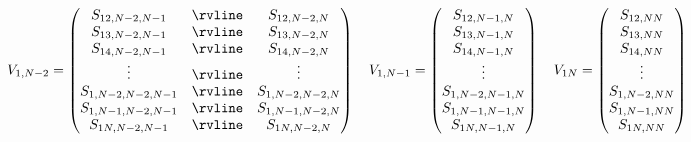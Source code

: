 \begin{appendices}
\begin{equation}
    \label{eq:ch3_QSD-V_1N_2}
    V_{1,N-2} =
    \begin{pmatrix}
        S_{12,N-2,N-1} & \rvline & S_{12,N-2,N} \\
        S_{13,N-2,N-1} & \rvline & S_{13,N-2,N} \\
        S_{14,N-2,N-1} & \rvline & S_{14,N-2,N} \\
        \vdots & \rvline & \vdots \\
        S_{1,N-2,N-2,N-1} & \rvline & S_{1,N-2,N-2,N} \\
        S_{1,N-1,N-2,N-1} & \rvline & S_{1,N-1,N-2,N} \\
        S_{1N,N-2,N-1} & \rvline & S_{1N,N-2,N} \\
    \end{pmatrix}
    \quad
    V_{1,N-1} = 
    \begin{pmatrix}
        S_{12,N-1,N} \\
        S_{13,N-1,N} \\
        S_{14,N-1,N} \\
        \vdots \\
        S_{1,N-2,N-1,N} \\
        S_{1,N-1,N-1,N} \\
        S_{1N,N-1,N} \\
    \end{pmatrix}
    \quad
    V_{1N} =
    \begin{pmatrix}
        S_{12,NN} \\
        S_{13,NN} \\
        S_{14,NN} \\
        \vdots \\
        S_{1,N-2,NN} \\
        S_{1,N-1,NN} \\
        S_{1N,NN} \\
    \end{pmatrix}
\end{equation}


\end{appendices}
